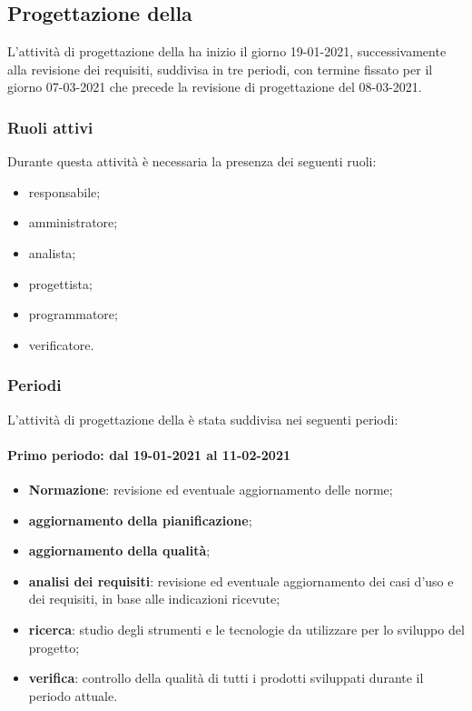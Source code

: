 \newpage %

\subsection{Progettazione della } 
L'attività di progettazione della  ha inizio il giorno 19-01-2021, successivamente alla revisione dei requisiti, suddivisa in tre periodi, con termine fissato per il giorno 07-03-2021 che precede la revisione di progettazione del 08-03-2021. 

\subsubsection{Ruoli attivi} 
Durante questa attività è necessaria la presenza dei seguenti ruoli: 
\begin{itemize} 
	\item responsabile; 
	\item amministratore; 
	\item analista; 
	\item progettista; 
	\item programmatore; 
	\item verificatore.
\end{itemize} 

\subsubsection{Periodi} 
L'attività di progettazione della  è stata suddivisa nei seguenti periodi: 

\paragraph{Primo periodo: dal 19-01-2021 al 11-02-2021} 
\begin{itemize} 
	\item \textbf{Normazione}: revisione ed eventuale aggiornamento delle norme; 
	\item \textbf{aggiornamento della pianificazione}; 
	\item \textbf{aggiornamento della qualità}; 
	\item \textbf{analisi dei requisiti}: revisione ed eventuale aggiornamento dei casi d’uso e dei requisiti, in base alle indicazioni ricevute; 
	\item \textbf{ricerca}: studio degli strumenti e le tecnologie da utilizzare per lo sviluppo del 
	progetto; 
	\item \textbf{verifica}: controllo della qualità di tutti i prodotti sviluppati durante il periodo attuale. 
\end{itemize} 

